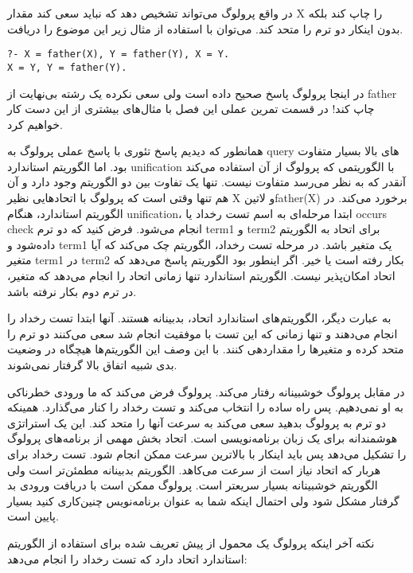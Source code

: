 در واقع پرولوگ می‌تواند تشخیص دهد که نباید سعی کند مقدار X را چاپ  کند بلکه بدون اینکار دو ترم را متحد کند. می‌توان با استفاده از مثال زیر این موضوع را دریافت.

\begin{latin}
\begin{lstlisting}
?- X = father(X), Y = father(Y), X = Y.
X = Y, Y = father(Y).
\end{lstlisting}
\end{latin}

در اینجا پرولوگ پاسخ صحیح داده است ولی سعی نکرده یک رشته بی‌نهایت از father چاپ کند! در قسمت تمرین عملی این فصل با مثال‌های بیشتری از این دست کار خواهیم کرد.

همانطور که دیدیم پاسخ تئوری با پاسخ عملی پرولوگ به query های بالا بسیار متفاوت بود. اما الگوریتم استاندارد unification با الگوریتمی که پرولوگ از آن استفاده می‌کند آنقدر که به نظر می‌رسد متفاوت نیست. تنها یک تفاوت بین دو الگوریتم وجود دارد و آن هم تنها وقتی است که پرولوگ با اتحادهایی نظیر X و ‌لاتین{father(X)} برخورد می‌کند. در الگوریتم استاندارد، هنگام unification، ابتدا مرحله‌ای به اسم تست رخداد یا occurs check انجام می‌شود. فرض کنید که دو ترم term1‌ و term2 برای اتحاد به الگوریتم داده‌شود و term1 یک متغیر باشد. در مرحله تست رخداد، الگوریتم چک می‌کند که آیا متغیر term1 در term2 بکار رفته است یا خیر. اگر اینطور بود الگوریتم پاسخ می‌دهد که اتحاد امکان‌پذیر نیست. الگوریتم استاندارد تنها زمانی اتحاد را انجام می‌دهد که متغیر، در ترم دوم بکار نرفته باشد.

به عبارت دیگر، الگوریتم‌های استاندارد اتحاد، بدبینانه هستند. آنها ابتدا تست رخداد را انجام می‌دهند و تنها زمانی که این تست با موفقیت انجام شد سعی می‌کنند دو ترم را متحد کرده و متغیرها را مقداردهی کنند. با این وصف این الگوریتم‌ها هیچگاه در وضعیت بدی شبیه اتفاق بالا گرفتار نمی‌شوند.

در مقابل پرولوگ خوشبینانه رفتار می‌کند. پرولوگ فرض می‌کند که ما ورودی خطرناکی به او نمی‌دهیم. پس راه ساده را انتخاب می‌کند و تست رخداد را کنار می‌گذارد. همینکه دو ترم به پرولوگ بدهید سعی می‌کند به سرعت آنها را متحد کند. این یک استراتژی هوشمندانه برای یک زبان برنامه‌نویسی است. اتحاد بخش مهمی از برنامه‌های پرولوگ را تشکیل می‌دهد پس باید اینکار با بالاترین سرعت ممکن انجام شود. تست رخداد برای هربار که اتحاد نیاز است از سرعت می‌کاهد. الگوریتم بدبینانه مطمئن‌تر است ولی الگوریتم خوشبینانه بسیار سریعتر است. پرولوگ ممکن است با دریافت ورودی بد گرفتار مشکل شود ولی احتمال اینکه شما به عنوان برنامه‌نویس چنین‌کاری کنید بسیار پایین است.

نکته آخر اینکه پرولوگ یک محمول از پیش تعریف شده برای استفاده از الگوریتم استاندارد اتحاد دارد که تست رخداد را انجام می‌دهد:

